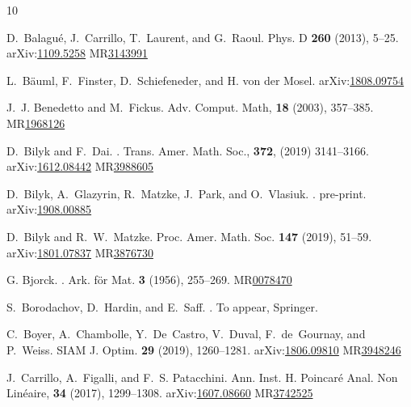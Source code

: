\documentclass[11pt, leqno]{amsart}
\def\arXiv#1{arXiv:\href{http://arXiv.org/abs/#1}{#1}}
\def\MR#1{MR\href{http://www.ams.org/mathscinet-getitem?mr=#1}{#1}}
\theoremstyle{definition}
\numberwithin{equation}{section}
\begin{document}
\begin{thebibliography}{10}


D.~Balagu{\'e}, J.~Carrillo, T.~Laurent, and G.~Raoul.
\newblock Phys. D { \bf 260} (2013), 5--25. 
\arXiv{1109.5258}
\MR{3143991}

L.~B\"{a}uml, F.~Finster, D.~Schiefeneder, and H. von der Mosel.
\arXiv{1808.09754}

J.~J. Benedetto and M.~Fickus.
\newblock  Adv. Comput. Math, {\bf 18} (2003), 357--385. 
\MR{1968126}


D.~Bilyk and F.~Dai.
.
\newblock  Trans. Amer. Math. Soc., {\bf 372}, (2019) 3141--3166. 
\arXiv{1612.08442}
\MR{3988605}

D.~Bilyk, A.~Glazyrin, R.~Matzke, J.~Park, and O.~Vlasiuk.
.
\newblock pre-print.
\arXiv{1908.00885}

 D.~Bilyk and R.~W.~Matzke.
 \newblock Proc. Amer. Math. Soc. {\bf 147} (2019), 51--59.
\arXiv{1801.07837}
\MR{3876730}

G. Bjorck.
.
\newblock Ark. f{\"{o}}r Mat. {\bf 3} (1956), 255--269.
\MR{0078470}

S.~Borodachov, D.~Hardin, and E.~Saff.
.
\newblock To appear, Springer.

C.~Boyer, A.~Chambolle, Y.~De~Castro, V.~Duval, F.~de~Gournay, and P.~Weiss.
\newblock  SIAM J. Optim. {\bf 29} (2019), 1260–1281.
\arXiv{1806.09810}
\MR{3948246}

J.~Carrillo, A.~Figalli, and F.~S. Patacchini.
\newblock Ann. Inst. H. Poincar\'e Anal. Non Lin\'eaire, {\bf 34} (2017), 1299--1308. 
\arXiv{1607.08660}
\MR{3742525}


\end{thebibliography}
\end{document}
